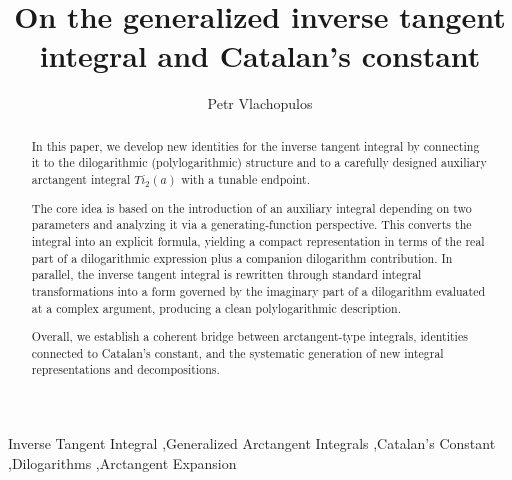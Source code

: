 \documentclass[preprint,12pt,nopreprintline]{elsarticle}
\begin{document}
\begin{frontmatter}



\title{On the generalized inverse tangent integral and Catalan’s constant}


\author[inst1]{Petr Vlachopulos}



\begin{abstract}
In this paper, we develop new identities for the inverse tangent integral by connecting it to the dilogarithmic (polylogarithmic) structure and to a carefully designed auxiliary arctangent integral $Ti_2(a)$ with a tunable endpoint.

The core idea is based on the introduction of an auxiliary integral depending on two parameters and analyzing it via a generating-function perspective. This converts the integral into an explicit formula, yielding a compact representation in terms of the real part of a dilogarithmic expression plus a companion dilogarithm contribution. In parallel, the inverse tangent integral is rewritten through standard integral transformations into a form governed by the imaginary part of a dilogarithm evaluated at a complex argument, producing a clean polylogarithmic description.

Overall, we establish a coherent bridge between arctangent-type integrals, identities connected to Catalan’s constant, and the systematic generation of new integral representations and decompositions.

\end{abstract}

\begin{keyword}

Inverse Tangent Integral \sep Generalized Arctangent Integrals \sep Catalan’s Constant \sep Dilogarithms \sep Arctangent Expansion
\end{keyword}

\end{frontmatter}


\label{sec:sample1}


\vspace{0.5cm}

\newcommand\restr[2]{{
  \left.\kern-\nulldelimiterspace 
  \littletaller 
  \right|_{#2} 
  }}
\end{document}
